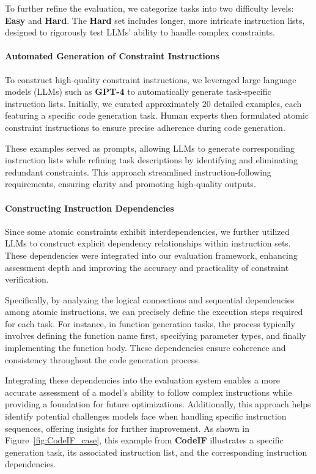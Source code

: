 To further refine the evaluation, we categorize tasks into two difficulty levels: \textbf{Easy} and \textbf{Hard}. The \textbf{Hard} set includes longer, more intricate instruction lists, designed to rigorously test LLMs’ ability to handle complex constraints.

\paragraph{Automated Generation of Constraint Instructions}
To construct high-quality constraint instructions, we leveraged large language models (LLMs) such as \textbf{GPT-4} to automatically generate task-specific instruction lists. Initially, we curated approximately 20 detailed examples, each featuring a specific code generation task. Human experts then formulated atomic constraint instructions to ensure precise adherence during code generation.

These examples served as prompts, allowing LLMs to generate corresponding instruction lists while refining task descriptions by identifying and eliminating redundant constraints. This approach streamlined instruction-following requirements, ensuring clarity and promoting high-quality outputs.

\paragraph{Constructing Instruction Dependencies}
Since some atomic constraints exhibit interdependencies, we further utilized LLMs to construct explicit dependency relationships within instruction sets. These dependencies were integrated into our evaluation framework, enhancing assessment depth and improving the accuracy and practicality of constraint verification.


Specifically, by analyzing the logical connections and sequential dependencies among atomic instructions, we can precisely define the execution steps required for each task. For instance, in function generation tasks, the process typically involves defining the function name first, specifying parameter types, and finally implementing the function body. These dependencies ensure coherence and consistency throughout the code generation process.

Integrating these dependencies into the evaluation system enables a more accurate assessment of a model's ability to follow complex instructions while providing a foundation for future optimizations. Additionally, this approach helps identify potential challenges models face when handling specific instruction sequences, offering insights for further improvement. As shown in Figure~\ref{fig:CodeIF_case}, this example from \textbf{CodeIF} illustrates a specific generation task, its associated instruction list, and the corresponding instruction dependencies.


